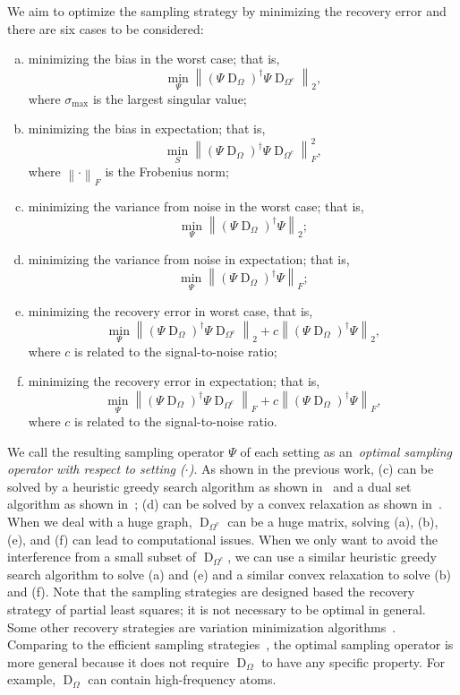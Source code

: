 \documentclass[journal,twocolumn,10pt]{IEEEtran}
\theoremstyle{definition}
\DeclareMathOperator{\D}{D}
\begin{document}
We aim to optimize the sampling strategy by minimizing the recovery error and there are six cases to be considered: 
\begin{enumerate}[(a)]
	\item minimizing the bias in the worst case; that is,	
	$$
	\min_{\Psi}  \left\| (\Psi \D_{\Omega} )^{\dagger} \Psi  \D_{\Omega^c} \right\|_2,
	$$
	where $ \sigma_{\max}$ is the largest singular value;
	\item minimizing the bias in expectation; that is,	
	$$
	\min_{S}   \left\| (\Psi \D_{\Omega} )^{\dagger} \Psi   \D_{\Omega^c} \right\|_{F}^2,
	$$
	where $\left\| \cdot \right\|_F$ is the Frobenius norm;
	\item minimizing the variance from noise in the worst case; that is,	
	$$
	\min_{\Psi}  \left\| (\Psi \D_{\Omega} )^{\dagger} \Psi  \right\|_2;
	$$
	\item minimizing the variance from noise in expectation; that is,	
	$$
	\min_{\Psi}  \left\| (\Psi \D_{\Omega} )^{\dagger} \Psi  \right\|_F;
	$$
	\item minimizing the recovery error in worst case, that is,
$$
	\min_{\Psi}  \left\| (\Psi \D_{\Omega} )^{\dagger} \Psi  \D_{\Omega^c} \right\|_2	+ c \left\| (\Psi \D_{\Omega} )^{\dagger} \Psi  \right\|_2,
$$
	where $c$ is related to the signal-to-noise ratio;
	\item minimizing the recovery error in expectation; that is,
$$
	\min_{\Psi}  \left\| (\Psi \D_{\Omega} )^{\dagger} \Psi  \D_{\Omega^c} \right\|_F + c \left\| (\Psi \D_{\Omega} )^{\dagger} \Psi  \right\|_F,
$$
	where $c$ is related to the signal-to-noise ratio.
\end{enumerate}

We call the resulting sampling operator $\Psi$ of each setting as an~\emph{optimal sampling operator with respect to setting ($\cdot$)}.  As shown in the previous work, (c) can be solved by a heuristic greedy search algorithm as shown in~\cite{ChenVSK:15} and a dual set algorithm as shown in~\cite{BoutsidisDM:14}; (d) can be solved by a convex relaxation as shown in~\cite{DavenportMNW:15}. When we deal with a huge graph, $\D_{\Omega^c}$ can be a huge matrix, solving (a), (b), (e), and (f) can lead to computational issues. When we only want to avoid the interference from a small subset of  $\D_{\Omega^c}$, we can use a similar heuristic greedy search algorithm to solve (a) and (e) and a similar convex relaxation to solve (b) and (f). Note that the sampling strategies are designed based the recovery strategy of partial least squares; it is not necessary to be optimal in general. Some other recovery strategies are variation minimization algorithms~\cite{ZhuGL:03, ZhouS:04, ChenSMK:14, AnisAO:15}. Comparing to the efficient sampling strategies~\cite{AnisAO:15}, the optimal sampling  operator is more general because it does not require $\D_{\Omega}$ to have any specific property. For example, $\D_{\Omega}$ can contain high-frequency atoms.
\end{document}
